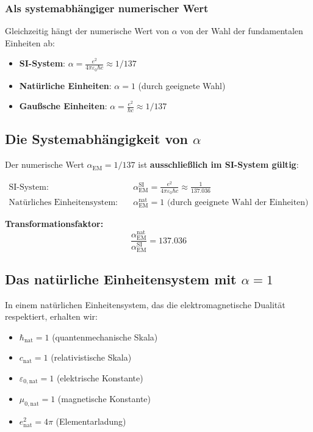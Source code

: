 \subsubsection{Als systemabhängiger numerischer Wert}
\label{subsubsec:system_dependent}

Gleichzeitig hängt der numerische Wert von $\alpha$ von der Wahl der fundamentalen Einheiten ab:

\begin{itemize}
	\item \textbf{SI-System}: $\alpha = \frac{e^2}{4\pi\varepsilon_0\hbar c} \approx 1/137$
	\item \textbf{Natürliche Einheiten}: $\alpha = 1$ (durch geeignete Wahl)
	\item \textbf{Gaußsche Einheiten}: $\alpha = \frac{e^2}{\hbar c} \approx 1/137$
\end{itemize}

\subsection{Die Systemabhängigkeit von $\alpha$}
\label{subsec:alpha_system_dependency}

Der numerische Wert $\alpha_{\text{EM}} = 1/137$ ist \textbf{ausschließlich im SI-System gültig}:

\begin{align}
	\text{SI-System:} \quad &\alpha_{\text{EM}}^{\text{SI}} = \frac{e^2}{4\pi\varepsilon_0\hbar c} \approx \frac{1}{137.036} \\
	\text{Natürliches Einheitensystem:} \quad &\alpha_{\text{EM}}^{\text{nat}} = 1 \text{ (durch geeignete Wahl der Einheiten)}
\end{align}

\textbf{Transformationsfaktor:}
\begin{equation}
	\frac{\alpha_{\text{EM}}^{\text{nat}}}{\alpha_{\text{EM}}^{\text{SI}}} = 137.036
\end{equation}

\subsection{Das natürliche Einheitensystem mit $\alpha = 1$}
\label{subsec:natural_units}

In einem natürlichen Einheitensystem, das die elektromagnetische Dualität respektiert, erhalten wir:

\begin{itemize}
	\item $\hbar_{\text{nat}} = 1$ (quantenmechanische Skala)
	\item $c_{\text{nat}} = 1$ (relativistische Skala)
	\item $\varepsilon_{0,\text{nat}} = 1$ (elektrische Konstante)
	\item $\mu_{0,\text{nat}} = 1$ (magnetische Konstante)
	\item $e_{\text{nat}}^2 = 4\pi$ (Elementarladung)
\end{itemize}

